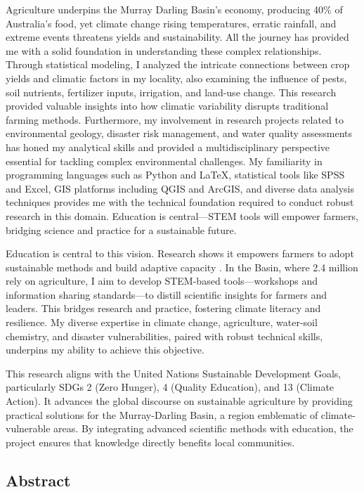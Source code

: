 Agriculture underpins the Murray Darling Basin’s economy, producing 40\% of Australia’s food, yet climate change rising temperatures, erratic rainfall, and extreme events threatens yields and sustainability. All the journey has provided me with a solid foundation in understanding these complex relationships. Through statistical modeling, I analyzed the intricate connections between crop yields and climatic factors in my locality, also examining the influence of pests, soil nutrients, fertilizer inputs, irrigation, and land-use change. This research provided valuable insights into how climatic variability disrupts traditional farming methods. Furthermore, my involvement in research projects related to environmental geology, disaster risk management, and water quality assessments has honed my analytical skills and provided a multidisciplinary perspective essential for tackling complex environmental challenges. My familiarity in programming languages such as Python and LaTeX, statistical tools like SPSS and Excel, GIS platforms including QGIS and ArcGIS, and diverse data analysis techniques provides me with the technical foundation required to conduct robust research in this domain. Education is central—STEM tools will empower farmers, bridging science and practice for a sustainable future. 


Education is central to this vision. Research shows it empowers farmers to adopt sustainable methods and build adaptive capacity \parencite{prettyIntensificationRedesignedSustainable2018}. In the Basin, where 2.4 million rely on agriculture, I aim to develop STEM-based tools—workshops and information sharing standards—to distill scientific insights for farmers and leaders. This bridges research and practice, fostering climate literacy and resilience. My diverse expertise in climate change, agriculture, water-soil chemistry, and disaster vulnerabilities, paired with robust technical skills, underpins my ability to achieve this objective.

This research aligns with the United Nations Sustainable Development Goals, particularly SDGs 2 (Zero Hunger), 4 (Quality Education), and 13 (Climate Action). It advances the global discourse on sustainable agriculture by providing practical solutions for the Murray-Darling Basin, a region emblematic of climate-vulnerable areas. By integrating advanced scientific methods with education, the project ensures that knowledge directly benefits local communities.

\subsection{Abstract}


